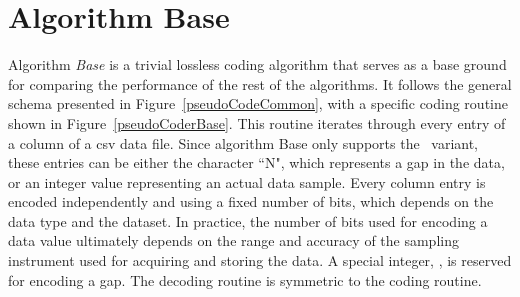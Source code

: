 

\clearpage
\section{Algorithm Base}
\label{algo:base}
\newcommand{\codeColumn}{$\text{code\_column}$}
\newcommand{\decodeColumn}{$\text{decode\_column}$}

\vspace{-10pt}
Algorithm \textit{Base} is a trivial lossless coding algorithm that serves as a base ground for comparing the performance of the rest of the algorithms. It follows the general schema presented in Figure~\ref{pseudoCodeCommon}, with a specific coding routine shown in Figure~\ref{pseudoCoderBase}. This routine iterates through every entry of a column of a csv data file. Since algorithm Base only supports the \NOmaskalgo\ variant, these entries can be either the character ``N", which represents a gap in the data, or an integer value representing an actual data sample. Every column entry is encoded independently and using a fixed number of bits, which depends on the data type and the dataset. In practice, the number of bits used for encoding a data value ultimately depends on the range and accuracy of the sampling instrument used for acquiring and storing the data. A special integer, \nodata, is reserved for encoding a gap. The decoding routine is symmetric to the coding routine.




